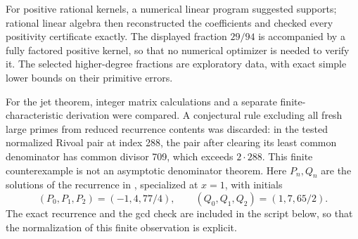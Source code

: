 \documentclass[11pt,a4paper]{article}
\theoremstyle{definition}
\theoremstyle{remark}
\numberwithin{equation}{section}
\begin{document}
For positive rational kernels, a numerical linear program suggested
supports; rational linear algebra then reconstructed the coefficients
and checked every positivity certificate exactly. The displayed
fraction $29/94$ is accompanied by a fully factored positive kernel,
so that no numerical optimizer is needed to verify it. The selected
higher-degree fractions are exploratory data, with exact simple
lower bounds on their primitive errors.

For the jet theorem, integer matrix calculations and a separate
finite-characteristic derivation were compared. A conjectural rule
excluding all fresh large primes from reduced recurrence contents
was discarded: in the tested normalized Rivoal pair at index 288,
the pair after clearing its least common denominator has common
divisor 709, which exceeds
$2\cdot288$. This finite counterexample is not an asymptotic
denominator theorem. Here $P_n,Q_n$ are the solutions of the
recurrence in \cite[Section 1]{p5:Rivoal2009}, specialized at $x=1$,
with initials
\[
 (P_0,P_1,P_2)=(-1,4,77/4),\qquad
 (Q_0,Q_1,Q_2)=(1,7,65/2).
\]
The exact recurrence and the gcd check are included in the script
below, so that the normalization of this finite observation is explicit.
\end{document}
